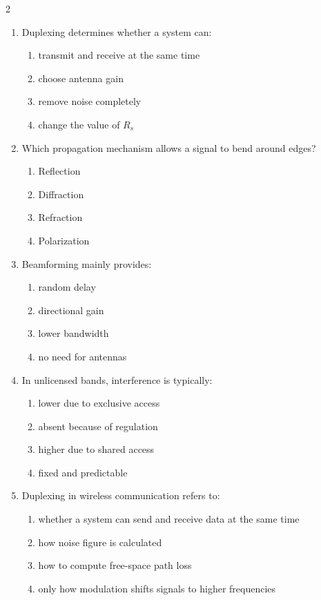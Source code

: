 \begin{multicols}{2}
\begin{enumerate}[leftmargin=*, itemsep=0.4em]
\item Duplexing determines whether a system can:
\begin{enumerate}[label=\alph*)]
\item transmit and receive at the same time
\item choose antenna gain
\item remove noise completely
\item change the value of $R_s$
\end{enumerate}

\item Which propagation mechanism allows a signal to bend around edges?
\begin{enumerate}[label=\alph*)]
\item Reflection
\item Diffraction
\item Refraction
\item Polarization
\end{enumerate}

\item Beamforming mainly provides:
\begin{enumerate}[label=\alph*)]
\item random delay
\item directional gain
\item lower bandwidth
\item no need for antennas
\end{enumerate}

\item In unlicensed bands, interference is typically:
\begin{enumerate}[label=\alph*)]
\item lower due to exclusive access
\item absent because of regulation
\item higher due to shared access
\item fixed and predictable
\end{enumerate}

\item Duplexing in wireless communication refers to:
\begin{enumerate}[label=\alph*)]
\item whether a system can send and receive data at the same time
\item how noise figure is calculated
\item how to compute free-space path loss
\item only how modulation shifts signals to higher frequencies
\end{enumerate}


\end{enumerate}
\end{multicols}
